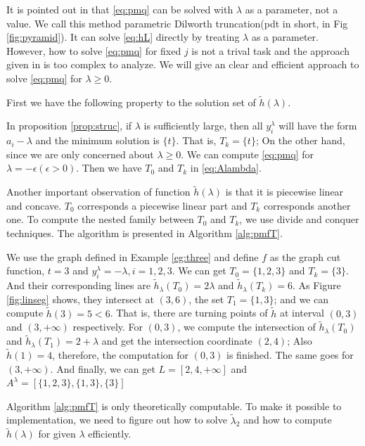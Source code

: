 \documentclass{article}
\begin{document}
It is pointed out in \cite{RN4} that \eqref{eq:pmq} can be solved with $\lambda$ as a parameter, not a value. We call this method parametric Dilworth truncation(pdt in short, in Fig \ref{fig:pyramid}). It can solve \eqref{eq:hL} directly by treating $\lambda$ as a parameter. However, how to solve \eqref{eq:pmq} for fixed $j$ is not a trival task and the approach given in \cite{RN4} is too complex to analyze. We will give an clear and efficient approach to solve \eqref{eq:pmq} for $\lambda\geq 0$. 

First we have the following property to the solution set of $\tilde{h}(\lambda) $.


In proposition \ref{prop:struc}, if $\lambda$ is sufficiently large, then all $y_i^{\lambda}$ will have the form $a_i -  \lambda$ and the minimum solution is $\{t\}$. That is, $T_k = \{t\}$; On the other hand, since we are only concerned about $\lambda \geq 0$. We can compute \eqref{eq:pmq} for $\lambda = -\epsilon (\epsilon > 0)$. Then we have $T_0$ and $T_k$ in \eqref{eq:Alambda}.

Another important observation of function $\tilde{h}(\lambda)$ is that it is piecewise linear and concave. $T_0$ corresponds a piecewise linear part and $T_k$ corresponds another one.  To compute the nested family between $T_0$ and $T_k$, we use divide and conquer techniques. The algorithm is presented in Algorithm \ref{alg:pmfT}.


\begin{example}
We use the graph defined in Example \ref{eg:three} and define $f$ as the graph cut function, $t=3$ and $y^{\lambda}_i = -\lambda, i=1,2,3$. 
We can get $T_0 = \{1,2,3\} $ and $T_k = \{3\}$. And their corresponding lines are $\tilde{h}_{\lambda}(T_0) =2\lambda$ and $\tilde{h}_{\lambda}(T_k)=6$. As Figure \ref{fig:linseg} shows, they intersect at $(3, 6)$, the set $T_1=\{1,3\}$; and we can compute $\tilde{h}(3)=5<6$. That is, there are turning points of $\tilde{h}$ at interval $(0, 3)$ and $(3, +\infty)$ respectively. For $(0,3)$, we compute the intersection of $\tilde{h}_{\lambda}(T_0)$ and $\tilde{h}_{\lambda}(T_1)=2+\lambda$ and get the intersection coordinate $(2,4)$; Also $\tilde{h}(1)=4$, therefore, the computation for $(0,3)$ is finished. The same goes for $(3, +\infty)$. And finally, we can get $L=[2,4, +\infty]$ and $A^{\lambda} = [\{1,2,3\}, \{1,3\},\{3\}]$	
\end{example}

Algorithm \ref{alg:pmfT} is only theoretically computable. To make it possible to implementation, we need to figure out how to solve $\tilde{\lambda}_2$ and how to compute $\tilde{h}(\lambda)$ for given $\lambda$ efficiently.
\end{document}
